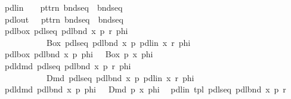 \begin{isabellebody}
\ \ {\isachardoublequote}{\isacharunderscore}pdlin{\isachardoublequote}\ \ \ {\isacharcolon}{\isacharcolon}\ {\isachardoublequote}{\isacharbrackleft}pttrn{\isacharcomma}\ bndseq{\isacharbrackright}\ {\isasymRightarrow}\ bndseq{\isachardoublequote}\ \ \ \ \ \ \ \isanewline
\ \ {\isachardoublequote}{\isacharunderscore}pdlout{\isachardoublequote}\ \ {\isacharcolon}{\isacharcolon}\ {\isachardoublequote}{\isacharbrackleft}pttrn{\isacharcomma}\ bndseq{\isacharbrackright}\ {\isasymRightarrow}\ bndseq{\isachardoublequote}\ \ \ \ \ \ \isanewline
\isanewline
\isanewline
\isanewline
\isamarkupfalse%
\ \isanewline
\ \ {\isachardoublequote}{\isacharunderscore}pdlbox\ {\isacharparenleft}{\isacharunderscore}pdlseq\ {\isacharparenleft}{\isacharunderscore}pdlbnd\ x\ p{\isacharparenright}\ r{\isacharparenright}\ phi{\isachardoublequote}\ \ \isanewline
\ \ \ \ \ \ \ \ \ \ {\isasymrightharpoonup}\ \ {\isachardoublequote}Box\ {\isacharparenleft}{\isacharunderscore}pdlseq\ {\isacharparenleft}{\isacharunderscore}pdlbnd\ x\ p{\isacharparenright}\ {\isacharparenleft}{\isacharunderscore}pdlin\ x\ r{\isacharparenright}{\isacharparenright}\ phi{\isachardoublequote}\isanewline
\ \ {\isachardoublequote}{\isacharunderscore}pdlbox\ {\isacharparenleft}{\isacharunderscore}pdlbnd\ x\ p{\isacharparenright}\ phi{\isachardoublequote}\ \ {\isasymrightharpoonup}\ {\isachardoublequote}Box\ p\ {\isacharparenleft}{\isasymlambda}x{\isachardot}\ phi{\isacharparenright}{\isachardoublequote}\isanewline
\ \ {\isachardoublequote}{\isacharunderscore}pdldmd\ {\isacharparenleft}{\isacharunderscore}pdlseq\ {\isacharparenleft}{\isacharunderscore}pdlbnd\ x\ p{\isacharparenright}\ r{\isacharparenright}\ phi{\isachardoublequote}\ \ \isanewline
\ \ \ \ \ \ \ \ \ \ {\isasymrightharpoonup}\ \ {\isachardoublequote}Dmd\ {\isacharparenleft}{\isacharunderscore}pdlseq\ {\isacharparenleft}{\isacharunderscore}pdlbnd\ x\ p{\isacharparenright}\ {\isacharparenleft}{\isacharunderscore}pdlin\ x\ r{\isacharparenright}{\isacharparenright}\ phi{\isachardoublequote}\isanewline
\ \ {\isachardoublequote}{\isacharunderscore}pdldmd\ {\isacharparenleft}{\isacharunderscore}pdlbnd\ x\ p{\isacharparenright}\ phi{\isachardoublequote}\ \ {\isasymrightharpoonup}\ {\isachardoublequote}Dmd\ p\ {\isacharparenleft}{\isasymlambda}x{\isachardot}\ phi{\isacharparenright}{\isachardoublequote}\isanewline
\ \ {\isachardoublequote}{\isacharunderscore}pdlin\ tpl\ {\isacharparenleft}{\isacharunderscore}pdlseq\ {\isacharparenleft}{\isacharunderscore}pdlbnd\ x\ p{\isacharparenright}\ r{\isacharparenright}{\isachardoublequote}\isanewline

\end{isabellebody}
